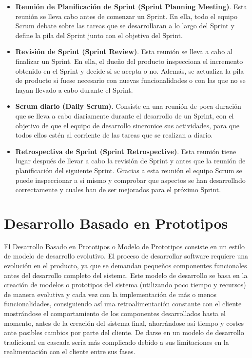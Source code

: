 \begin{itemize}
	\item \textbf{Reunión de Planificación de Sprint (Sprint Planning Meeting)}. Esta reunión se lleva cabo antes de comenzar un Sprint. En ella, todo el equipo Scrum debate sobre las tareas que se desarrollaran a lo largo del Sprint y define la pila del Sprint junto con el objetivo del Sprint.
	\item \textbf{Revisión de Sprint (Sprint Review)}. Esta reunión se lleva a cabo al finalizar un Sprint. En ella, el dueño del producto inspecciona el incremento obtenido en el Sprint y decide si se acepta o no. Además, se actualiza la pila de producto si fuese necesario con nuevas funcionalidades o con las que no se hayan llevado a cabo durante el Sprint.
	\item \textbf{Scrum diario (Daily Scrum)}. Consiste en una reunión de poca duración que se lleva a cabo diariamente durante el desarrollo de un Sprint, con el objetivo de que el equipo de desarrollo sincronice sus actividades, para que todos ellos estén al corriente de las tareas que se realizan a diario.
	\item \textbf{Retrospectiva de Sprint (Sprint Retrospective)}. Esta reunión tiene lugar después de llevar a cabo la revisión de Sprint y antes que la reunión de planificación del siguiente Sprint. Gracias a esta reunión el equipo Scrum se puede inspeccionar a si mismo y comprobar que aspectos se han desarrollado correctamente y cuales han de ser mejorados para el próximo Sprint.
\end{itemize}
\section{Desarrollo Basado en Prototipos}
\label{sec:DesarrolloPrototipos}

El Desarrollo Basado en Prototipos o Modelo de Prototipos consiste en un estilo de modelo de desarrollo evolutivo. El proceso de desarrollar software requiere una evolución en el producto, ya que se demandan pequeños componentes funcionales antes del desarrollo completo del sistema. Este modelo de desarrollo se basa en la creación de modelos o prototipos del sistema (utilizando poco tiempo y recursos) de manera evolutiva y cada vez con la implementación de más o menos funcionalidades, consiguiendo así una retroalimentación constante con el cliente mostrándose el comportamiento de los componentes desarrollados hasta el momento, antes de la creación del sistema final, ahorrándose así tiempo y costes ante posibles cambios por parte del cliente. De darse en un modelo de desarrollo tradicional en cascada sería más complicado debido a sus limitaciones en la realimentación con el cliente entre sus fases.

